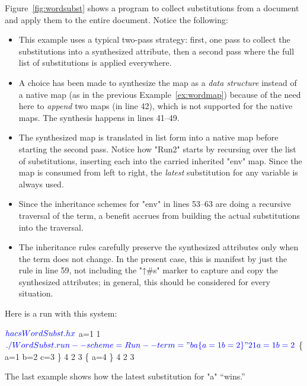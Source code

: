\documentclass[11pt]{article} %
\begin{document}
\begin{example}
  Figure~\ref{fig:wordsubst} shows a \HAX program to collect substitutions from a document and apply
  them to the entire document.  Notice the following:
  \begin{itemize}

  \item This example uses a typical two-pass strategy: first, one pass to collect the substitutions
    into a synthesized attribute, then a second pass where the full list of substitutions is applied
    everywhere.

  \item A choice has been made to synthesize the map as a \emph{data structure} instead of a native
    \HAX map (as in the previous Example~\ref{ex:wordmap}) because of the need here to \emph{append}
    two maps (in line 42), which is not supported for the native maps.  The synthesis happens in
    lines 41--49.

  \item The synthesized map is translated in list form into a native \HAX map before starting the
    second pass. Notice how "Run2" starts by recursing over the list of substitutions, inserting
    each into the carried inherited "env" map.  Since the map is consumed from left to right, the
    \emph{latest} substitution for any variable is always used.

  \item Since the inheritance schemes for "env" in lines 53--63 are doing a recursive traversal of
    the term, a benefit accrues from building the actual substitutions into the traversal.

  \item The inheritance rules carefully preserve the synthesized attributes only when the term does
    not change. In the present case, this is manifest by just the rule in line 59, not including the
    "↑#s" marker to capture and copy the synthesized attributes; in general, this should be
    considered for every situation.

  \end{itemize}
  Here is a run with this system:
\begin{code}[commandchars=\\\{\}]
$ \color{blue}{hacs WordSubst.hx}
$ 
 a=1  1   
$ \color{blue}{./WordSubst.run --scheme=Run --term="b a \{a=1 b=2\}"}
 2  1   {  a=1  b=2    }     
$ 
  \{  a=1  b=2  c=3     \}   4  2  3   \{  a=4   \}   4  2  3         
\end{code}
  The last example shows how the latest substitution for "a" ``wins.''
\end{example}
\end{document}
